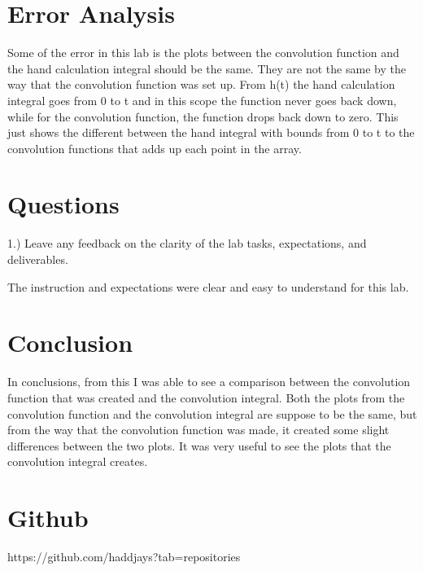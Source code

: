 \documentclass[11pt,a4]{report}
\begin{document}
\section{Error Analysis}

Some of the error in this lab is the plots between the convolution function and the hand calculation integral should be the same. They are not the same by the way that the convolution function was set up. From h(t) the hand calculation integral goes from 0 to t and in this scope the function never goes back down, while for the convolution function, the function drops back down to zero. This just shows the different between the hand integral with bounds from 0 to t to the convolution functions that adds up each point in the array. 

\section{Questions}
 1.) Leave any feedback on the clarity of the lab tasks, expectations, and deliverables.
 
 The instruction and expectations were clear and easy to understand for this lab. 


\section{Conclusion}
In conclusions, from this I was able to see a comparison between the convolution function that was created and the convolution integral. Both the plots from the convolution function and the convolution integral are suppose to be the same, but from the way that the convolution function was made, it created some slight differences between the two plots. It was very useful to see the plots that the convolution integral creates. 



\section{Github}
https://github.com/haddjays?tab=repositories
\end{document}
